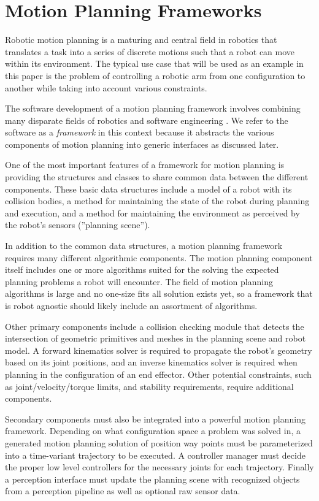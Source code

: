 \documentclass[10pt,journal,compsoc]{joser1}
\begin{document}
{\section{Motion Planning Frameworks}
\label{sec::motion_planning}

Robotic motion planning is a maturing and central field in robotics \cite{moll2011teaching} that translates a task into a series of discrete motions such that a robot can move within its environment. The typical use case that will be used as an example in this paper is the problem of controlling a robotic arm from one configuration to another while taking into account various constraints.

The software development of a motion planning framework involves combining many disparate fields of robotics and software engineering \cite{perez2010roadmap}. We refer to the software as a \textit{framework} in this context because it abstracts the various components of motion planning into generic interfaces as discussed later.

One of the most important features of a framework for motion planning is providing the structures and classes to share common data between the different components. These basic data structures include a model of a robot with its collision bodies, a method for maintaining the state of the robot during planning and execution, and a method for maintaining the environment as perceived by the robot's sensors (''planning scene'').

In addition to the common data structures, a motion planning framework requires many different algorithmic components. The motion planning component itself includes one or more algorithms suited for the solving the expected planning problems a robot will encounter. The field of motion planning algorithms is large and no one-size fits all solution exists yet, so a framework that is robot agnostic should likely include an assortment of algorithms.

Other primary components include a collision checking module that detects the intersection of geometric primitives and meshes in the planning scene and robot model. A forward kinematics solver is required to propagate the robot's geometry based on its joint positions, and an inverse kinematics solver is required when planning in the configuration of an end effector. Other potential constraints, such as joint/velocity/torque limits, and stability requirements, require additional components.

Secondary components must also be integrated into a powerful motion planning framework. Depending on what configuration space a problem was solved in, a generated motion planning solution of position way points must be parameterized into a time-variant trajectory to be executed. A controller manager must decide the proper low level controllers for the necessary joints for each trajectory. Finally a perception interface must update the planning scene with recognized objects from a perception pipeline as well as optional raw sensor data.

}
\end{document}
